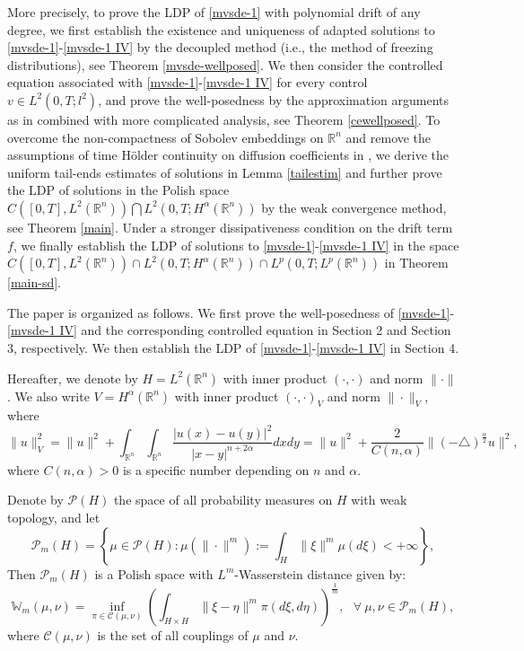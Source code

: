 \documentclass[11pt]{article}
\numberwithin{equation}{section}
\theoremstyle{plain}
\begin{document}
 More precisely,
 to prove the LDP of \eqref{mvsde-1} with polynomial drift of any degree,
 we first establish the existence and uniqueness of adapted solutions to \eqref{mvsde-1}-\eqref{mvsde-1 IV}
 by the decoupled method
    (i.e., the method of freezing distributions), see Theorem \ref{mvsde-wellposed}.
 We then consider the controlled equation associated with \eqref{mvsde-1}-\eqref{mvsde-1 IV} for every control $v \in L^2(0,T; l^2)$,
 and prove the well-posedness by the approximation  arguments as in \cite{hll2021AMO, hhl2022arXiv}
 combined with more complicated analysis, see Theorem \ref{cewellposed}.
 To overcome the non-compactness of Sobolev embeddings on $\mathbb{R}^n$ and
 remove the assumptions of time H\"{o}lder continuity on diffusion coefficients in \cite{hll2021AMO, hhl2022arXiv},
 we derive the uniform tail-ends estimates of solutions in Lemma \ref{tailestim}
 and further prove the LDP of solutions in the Polish space
    $C([0,T], L^2({\mathbb{R}}^n ) ) \bigcap L^2(0,T; H^\alpha ({\mathbb{R}}^n ) )$
 by the weak convergence method, see Theorem \ref{main}.
 Under a stronger dissipativeness condition on the drift term $f$,
 we finally establish the LDP of solutions to \eqref{mvsde-1}-\eqref{mvsde-1 IV} in the space
 $ C([0,T], L^2({\mathbb{R}}^n )) \cap L^2(0,T; H^\alpha ({\mathbb{R}}^n ) ) \cap L^p(0,T; L^p ({\mathbb{R}}^n ) ) $
 in Theorem \ref{main-sd}.

 The paper is organized as follows.
  We first prove the well-posedness of \eqref{mvsde-1}-\eqref{mvsde-1 IV}
  and the corresponding controlled equation in Section 2 and Section 3, respectively.
  We then establish the LDP of \eqref{mvsde-1}-\eqref{mvsde-1 IV} in Section 4.


 Hereafter, we denote by
            $H=L^2(\mathbb{R}^n)$
 with inner product $(\cdot, \cdot)$ and norm $\| \cdot \|$.
 We also write
    $V=H^\alpha(\mathbb{R}^n)$
 with inner product $(\cdot, \cdot)_V$ and norm $\| \cdot \|_V$,
 where
 $$
   \| u \|_V^2
   = \| u \|^2
     + \int_{\mathbb{R}^n} \int_{\mathbb{R}^n} {\frac {|u(x) -u(y) |^2}
       {|x-y|^{n + 2\alpha}} } dx dy
   = \| u \|^2
     + {\frac 2{ C(n,\alpha) } }
       \| (- \triangle)^{\frac {\alpha}2}  u \|^2,
 $$
 where $C(n,\alpha)>0$ is a specific   number depending
 on $n$   and  $\alpha$.



 Denote by $\mathcal{P}(H)$ the space of all probability measures on $H$ with weak topology,
 and let
    $$ \mathcal{P}_m(H)
        =
          \left\{
                  \mu \in \mathcal {P}(H) : \mu(\| \cdot \|^m) := \int_H \| \xi \|^m \mu(d \xi)
                                                                < + \infty
          \right\},
    $$
 Then $\mathcal{P}_m(H)$ is a Polish space with $L^m$-Wasserstein distance given by:
    $$ \mathbb{W}_m(\mu, \nu)
       = \inf_{ \pi \in \mathcal{C}(\mu, \nu) }
                    \left(
                           \int_{H \times H} \| \xi -\eta \|^m \pi (d\xi, d\eta)
                    \right)^{\frac{1}{m}}  ,
                    \ \ \  \forall \  \mu, \nu \in \mathcal {P}_m(H),
    $$
 where $\mathcal{C}(\mu, \nu)$ is the set of all couplings of $\mu$ and $\nu$.
\end{document}
